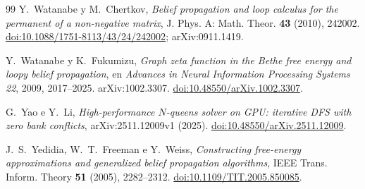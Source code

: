 \begin{thebibliography}{99}
 Y.~Watanabe y M.~Chertkov, \emph{Belief propagation and loop calculus for the permanent of a
non-negative matrix}, J. Phys. A: Math. Theor. \textbf{43} (2010), 242002.
\href{https://doi.org/10.1088/1751-8113/43/24/242002}{doi:10.1088/1751-8113/43/24/242002}; arXiv:0911.1419.

 Y.~Watanabe y K.~Fukumizu, \emph{Graph zeta function in the Bethe free energy and loopy
belief propagation}, en \emph{Advances in Neural Information Processing Systems 22}, 2009,
2017--2025. arXiv:1002.3307.
\href{https://doi.org/10.48550/arXiv.1002.3307}{doi:10.48550/arXiv.1002.3307}.

 G.~Yao e Y.~Li, \emph{High-performance $N$-queens solver on GPU: iterative DFS with zero
bank conflicts}, arXiv:2511.12009v1 (2025).
\href{https://doi.org/10.48550/arXiv.2511.12009}{doi:10.48550/arXiv.2511.12009}.

 J.~S.~Yedidia, W.~T.~Freeman e Y.~Weiss, \emph{Constructing free-energy approximations and
generalized belief propagation algorithms}, IEEE Trans. Inform. Theory \textbf{51} (2005), 2282--2312.
\href{https://doi.org/10.1109/TIT.2005.850085}{doi:10.1109/TIT.2005.850085}.

\end{thebibliography}
